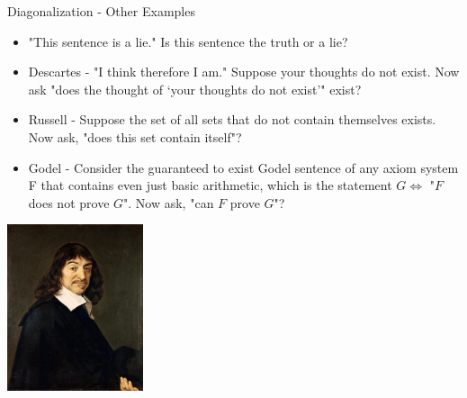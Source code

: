 \documentclass[aspectratio=169]{beamer}
\begin{document}
\begin{frame}{Diagonalization - Other Examples}
  \begin{itemize}
    \begin{itemize}
        \item "This sentence is a lie." Is this sentence the truth or a lie? \pause
        \item Descartes - "I think therefore I am." Suppose your thoughts do not exist. Now ask "does the thought of `your thoughts do not exist'" exist? \pause 
        \item Russell - Suppose the set of all sets that do not contain themselves exists. Now ask, "does this set contain itself"? \pause
        \item Godel - Consider the guaranteed to exist Godel sentence of any axiom system F that contains even just basic arithmetic, which is the statement $G \Leftrightarrow$ "$F$ does not prove $G$". Now ask, "can $F$ prove $G$"?
    \end{itemize}
  \end{itemize}
  \begin{flushright}
    \includegraphics[width=0.3\textwidth, height=0.3\textheight, keepaspectratio]{Descartes.jpg}
  \end{flushright}
\end{frame}
\end{document}
